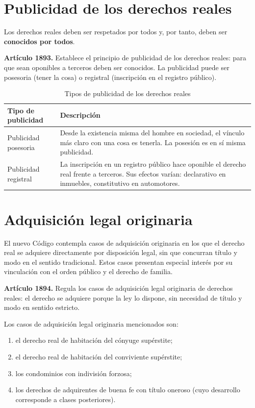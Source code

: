 \documentclass[12pt,oneside]{book}
\begin{document}
\section{Publicidad de los derechos reales}

Los derechos reales deben ser respetados por todos y, por tanto, deben ser \textbf{conocidos por todos}.

\begin{important}
\textbf{Artículo 1893.} Establece el principio de publicidad de los derechos reales: para que sean oponibles a terceros deben ser conocidos. La publicidad puede ser posesoria (tener la cosa) o registral (inscripción en el registro público).
\end{important}

\begin{table}[H]
\centering
\small
\begin{tabularx}{\textwidth}{>{\raggedright\arraybackslash}p{}>{\raggedright\arraybackslash}X}
\toprule
\textbf{Tipo de publicidad} & \textbf{Descripción} \\
\midrule
Publicidad posesoria &
Desde la existencia misma del hombre en sociedad, el vínculo más claro con una cosa es tenerla. La posesión es en sí misma publicidad. \\[0.5em]
Publicidad registral &
La inscripción en un registro público hace oponible el derecho real frente a terceros. Sus efectos varían: declarativo en inmuebles, constitutivo en automotores. \\
\bottomrule
\end{tabularx}
\caption{Tipos de publicidad de los derechos reales}
\end{table}

\section{Adquisición legal originaria}

El nuevo Código contempla casos de adquisición originaria en los que el derecho real se adquiere directamente por disposición legal, sin que concurran título y modo en el sentido tradicional. Estos casos presentan especial interés por su vinculación con el orden público y el derecho de familia.

\textbf{Artículo 1894.} Regula los casos de adquisición legal originaria de derechos reales: el derecho se adquiere porque la ley lo dispone, sin necesidad de título y modo en sentido estricto.

Los casos de adquisición legal originaria mencionados son:
\begin{enumerate}
    \item el derecho real de habitación del cónyuge supérstite;
    \item el derecho real de habitación del conviviente supérstite;
    \item los condominios con indivisión forzosa;
    \item los derechos de adquirentes de buena fe con título oneroso (cuyo desarrollo corresponde a clases posteriores).
\end{enumerate}
\end{document}
